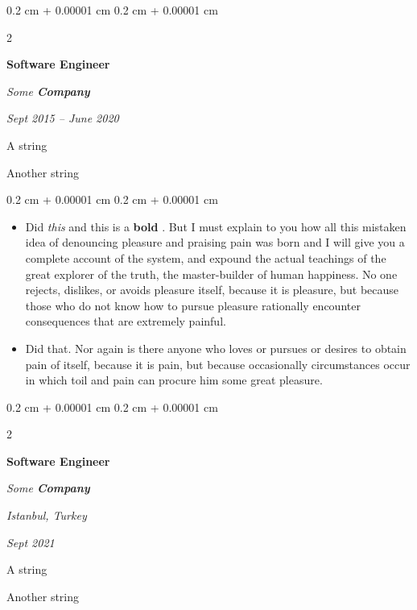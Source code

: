 \documentclass[10pt, letterpaper]{article}
\newenvironment{summary}{
    \begin{description}[
        topsep=0.10 cm,
        parsep=0.10 cm,
        partopsep=0pt,
        itemsep=0pt,
        leftmargin=0.4 cm + 10pt
    ]
}{
    \end{description}
} %
\newenvironment{highlights}{
    \begin{itemize}[
        topsep=0.10 cm,
        parsep=0.10 cm,
        partopsep=0pt,
        itemsep=0pt,
        leftmargin=0.4 cm + 10pt
    ]
}{
    \end{itemize}
} %
\newenvironment{onecolentry}{
    \begin{adjustwidth}{
        0.2 cm + 0.00001 cm
    }{
        0.2 cm + 0.00001 cm
    }
}{
    \end{adjustwidth}
} %
\newenvironment{twocolentry}[2][]{
    \onecolentry
    \def\secondColumn{#2}
    \setcolumnwidth{\fill, 4.5 cm}
    \begin{paracol}{2}
}{
    \switchcolumn \raggedleft \secondColumn
    \end{paracol}
    \endonecolentry
} %
\let\hrefWithoutArrow\href
\renewcommand{\href}[2]{\hrefWithoutArrow{#1}{\ifthenelse{\equal{#2}{}}{ }{#2 }\raisebox{.15ex}{\footnotesize \faExternalLink*}}}
\begin{document}
        \begin{twocolentry}{
            
            
        \textit{Sept 2015 – June 2020}}
            \textbf{Software Engineer}
            
            \textit{Some \textbf{Company}}
        \end{twocolentry}
            \begin{summary}
                \item A string
                \item Another string
            \end{summary}
        \vspace{0.10 cm}
        \begin{onecolentry}
            \begin{highlights}
                \item Did \textit{this} and this is a \textbf{bold} \href{https://example.com}{link}. But I must explain to you how all this mistaken idea of denouncing pleasure and praising pain was born and I will give you a complete account of the system, and expound the actual teachings of the great explorer of the truth, the master-builder of human happiness. No one rejects, dislikes, or avoids pleasure itself, because it is pleasure, but because those who do not know how to pursue pleasure rationally encounter consequences that are extremely painful.
                \item Did that. Nor again is there anyone who loves or pursues or desires to obtain pain of itself, because it is pain, but because occasionally circumstances occur in which toil and pain can procure him some great pleasure.
            \end{highlights}
        \end{onecolentry}


        \vspace{0.2 cm}

        \begin{twocolentry}{
        \textit{Istanbul, Turkey}    
            
        \textit{Sept 2021}}
            \textbf{Software Engineer}
            
            \textit{Some \textbf{Company}}
        \end{twocolentry}
            \begin{summary}
                \item A string
                \item Another string
            \end{summary}
\end{document}
